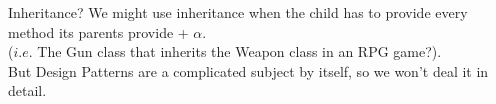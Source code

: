 \documentclass{beamer}
\begin{document}
\begin{frame}{Inheritance?}
  We might use inheritance when the child has to provide every method its parents
  provide + $\alpha$. \\($i.e.$ The Gun class that inherits the Weapon class in an RPG
  game?). \\But Design Patterns are a complicated subject by itself, so we won't
  deal it in detail.
\end{frame}
\end{document}
